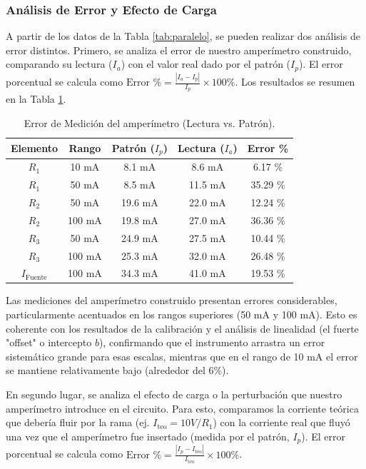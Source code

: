 \subsubsection{Análisis de Error y Efecto de Carga}

A partir de los datos de la Tabla \ref{tab:paralelo}, se pueden realizar dos análisis de error distintos. Primero, se analiza el error de nuestro amperímetro construido, comparando su lectura ($I_a$) con el valor real dado por el patrón ($I_p$). El error porcentual se calcula como $\text{Error \%} = \frac{|I_a - I_p|}{I_p} \times 100\%$. Los resultados se resumen en la Tabla \ref{tab:paralelo_error_medicion}.

\begin{table}[h!]
    \centering
    \caption{Error de Medición del amperímetro (Lectura vs. Patrón).}
    \label{tab:paralelo_error_medicion}
    \begin{tabular}{ccccc}
        \toprule
        \textbf{Elemento} & \textbf{Rango} & \textbf{Patrón ($I_p$)} & \textbf{Lectura ($I_a$)} & \textbf{Error \%} \\
        \midrule
        $R_1$ & 10 mA & 8.1 mA & 8.6 mA & 6.17 \% \\
        $R_1$ & 50 mA & 8.5 mA & 11.5 mA & 35.29 \% \\
        \midrule
        $R_2$ & 50 mA & 19.6 mA & 22.0 mA & 12.24 \% \\
        $R_2$ & 100 mA & 19.8 mA & 27.0 mA & 36.36 \% \\
        \midrule        
        $R_3$ & 50 mA & 24.9 mA & 27.5 mA & 10.44 \% \\
        $R_3$ & 100 mA & 25.3 mA & 32.0 mA & 26.48 \% \\
        \midrule
        $I_{\text{Fuente}}$ & 100 mA & 34.3 mA & 41.0 mA & 19.53 \% \\
        \bottomrule
    \end{tabular}
\end{table}

Las mediciones del amperímetro construido presentan errores considerables, particularmente acentuados en los rangos superiores (50 mA y 100 mA). Esto es coherente con los resultados de la calibración y el análisis de linealidad (el fuerte "offset" o intercepto $b$), confirmando que el instrumento arrastra un error sistemático grande para esas escalas, mientras que en el rango de 10 mA el error se mantiene relativamente bajo (alrededor del 6\%).

\newpage
En segundo lugar, se analiza el efecto de carga o la perturbación que nuestro amperímetro introduce en el circuito. Para esto, comparamos la corriente teórica que debería fluir por la rama (ej. $I_{\text{teo}} = 10V / R_1$) con la corriente real que fluyó una vez que el amperímetro fue insertado (medida por el patrón, $I_p$). El error porcentual se calcula como $\text{Error \%} = \frac{|I_p - I_{\text{teo}}|}{I_{\text{teo}}} \times 100\%$.

